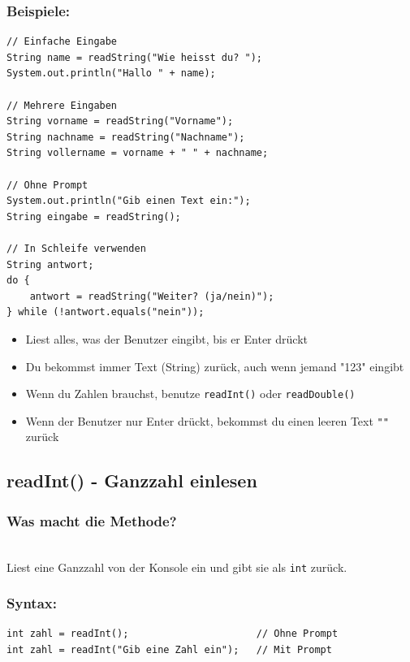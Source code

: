 \subsubsection*{Beispiele:}
\begin{lstlisting}
// Einfache Eingabe
String name = readString("Wie heisst du? ");
System.out.println("Hallo " + name);

// Mehrere Eingaben
String vorname = readString("Vorname");
String nachname = readString("Nachname");
String vollername = vorname + " " + nachname;

// Ohne Prompt
System.out.println("Gib einen Text ein:");
String eingabe = readString();

// In Schleife verwenden
String antwort;
do {
    antwort = readString("Weiter? (ja/nein)");
} while (!antwort.equals("nein"));
\end{lstlisting}

\begin{achtung}
	\begin{itemize}
		\item Liest alles, was der Benutzer eingibt, bis er Enter drückt
		\item Du bekommst immer Text (String) zurück, auch wenn jemand "123" eingibt
		\item Wenn du Zahlen brauchst, benutze \texttt{readInt()} oder \texttt{readDouble()}
		\item Wenn der Benutzer nur Enter drückt, bekommst du einen leeren Text \texttt{""} zurück
	\end{itemize}
\end{achtung}

\newpage


\subsection*{readInt() - Ganzzahl einlesen}

\subsubsection*{Was macht die Methode?}\\
Liest eine Ganzzahl von der Konsole ein und gibt sie als \texttt{int} zurück.

\subsubsection*{Syntax:}
\begin{lstlisting}
int zahl = readInt();                      // Ohne Prompt
int zahl = readInt("Gib eine Zahl ein");   // Mit Prompt
\end{lstlisting}

